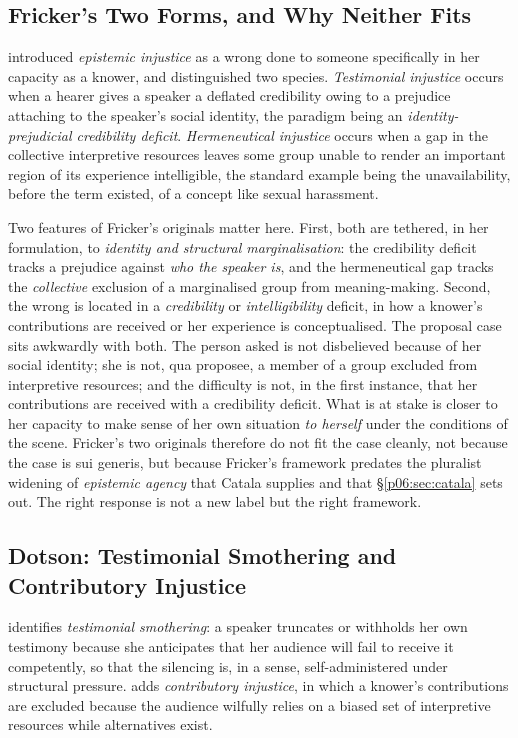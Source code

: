 \documentclass[11pt,a4paper]{article}
\begin{document}
\subsection{Fricker's Two Forms, and Why Neither Fits}

\textcite{fricker2007epistemic} introduced \emph{epistemic injustice} as a wrong done to someone specifically in her capacity as a knower, and distinguished two species. \emph{Testimonial injustice} occurs when a hearer gives a speaker a deflated credibility owing to a prejudice attaching to the speaker's social identity, the paradigm being an \emph{identity-prejudicial credibility deficit}. \emph{Hermeneutical injustice} occurs when a gap in the collective interpretive resources leaves some group unable to render an important region of its experience intelligible, the standard example being the unavailability, before the term existed, of a concept like sexual harassment.

Two features of Fricker's originals matter here. First, both are tethered, in her formulation, to \emph{identity and structural marginalisation}: the credibility deficit tracks a prejudice against \emph{who the speaker is}, and the hermeneutical gap tracks the \emph{collective} exclusion of a marginalised group from meaning-making. Second, the wrong is located in a \emph{credibility} or \emph{intelligibility} deficit, in how a knower's contributions are received or her experience is conceptualised. The proposal case sits awkwardly with both. The person asked is not disbelieved because of her social identity; she is not, qua proposee, a member of a group excluded from interpretive resources; and the difficulty is not, in the first instance, that her contributions are received with a credibility deficit. What is at stake is closer to her capacity to make sense of her own situation \emph{to herself} under the conditions of the scene. Fricker's two originals therefore do not fit the case cleanly, not because the case is sui generis, but because Fricker's framework predates the pluralist widening of \emph{epistemic agency} that Catala supplies and that §\ref{p06:sec:catala} sets out. The right response is not a new label but the right framework.

\subsection{Dotson: Testimonial Smothering and Contributory Injustice}

\textcite{dotson2011tracking} identifies \emph{testimonial smothering}: a speaker truncates or withholds her own testimony because she anticipates that her audience will fail to receive it competently, so that the silencing is, in a sense, self-administered under structural pressure. \textcite{dotson2012cautionary} adds \emph{contributory injustice}, in which a knower's contributions are excluded because the audience wilfully relies on a biased set of interpretive resources while alternatives exist.
\end{document}
